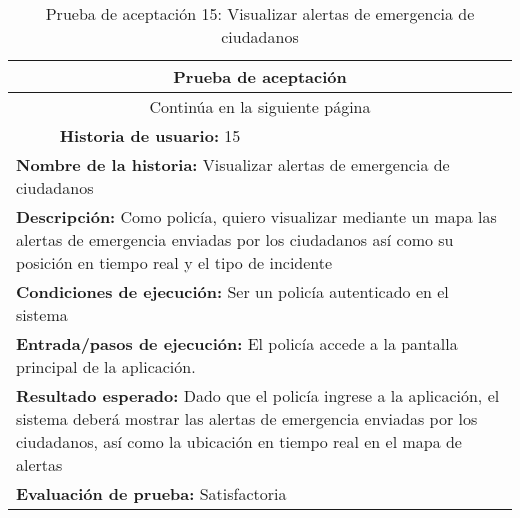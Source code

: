 \begin{longtable}{|p{6.7cm}|p{6.7cm}|}
    \caption{Prueba de aceptación 15: Visualizar alertas de emergencia de ciudadanos} \label{tab:prueba-15}                                                                                                                                              \\
    \hline
    \multicolumn{2}{|c|}{\textbf{Prueba de aceptación}}                                                                                                                                                                                                  \\
    \hline
    \endfirsthead
    \hline
    \endhead
    \hline
    \multicolumn{2}{|c|}{{Continúa en la siguiente página}}                                                                                                                                                                                              \\
    \hline
    \endfoot
    \hline
    \endlastfoot
    \multicolumn{1}{|p{6.7cm}|}{\textbf{Número} 15} & \multicolumn{1}{|p{6.7cm}|}{\textbf{Historia de usuario:} 15}                                                                                                                                      \\
    \hline
    \multicolumn{2}{|p{13.4cm}|}{\textbf{Nombre de la historia:} Visualizar alertas de emergencia de ciudadanos}                                                                                                                                         \\
    \hline
    \multicolumn{2}{|p{13.4cm}|}{\textbf{Descripción:} Como policía, quiero visualizar mediante un mapa las alertas de emergencia enviadas por los ciudadanos así como su posición en tiempo real y el tipo de incidente}                                \\
    \hline
    \multicolumn{2}{|p{13.4cm}|}{\textbf{Condiciones de ejecución:} Ser un policía autenticado en el sistema}                                                                                                                                            \\
    \hline
    \multicolumn{2}{|p{13.4cm}|}{\textbf{Entrada/pasos de ejecución:} El policía accede a la pantalla principal de la aplicación.}                                                                                                                       \\
    \hline
    \multicolumn{2}{|p{13.4cm}|}{\textbf{Resultado esperado:} Dado que el policía ingrese a la aplicación, el sistema deberá mostrar las alertas de emergencia enviadas por los ciudadanos,  así como la ubicación en tiempo real en el mapa de alertas} \\
    \hline
    \multicolumn{2}{|p{13.4cm}|}{\textbf{Evaluación de prueba:} Satisfactoria}                                                                                                                                                                           \\
    \hline
\end{longtable}

